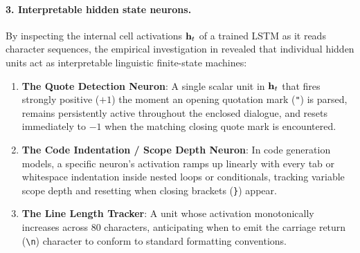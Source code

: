 \documentclass[../../main.tex]{subfiles}
\begin{document}
\paragraph{3. Interpretable hidden state neurons.}
By inspecting the internal cell activations $\mathbf{h}_t$ of a trained LSTM as it reads character sequences, the empirical investigation in \cite{karpathy2015rnn} revealed that individual hidden units act as interpretable linguistic finite-state machines:
\begin{enumerate}
    \item \textbf{The Quote Detection Neuron}: A single scalar unit in $\mathbf{h}_t$ that fires strongly positive ($+1$) the moment an opening quotation mark (\texttt{"}) is parsed, remains persistently active throughout the enclosed dialogue, and resets immediately to $-1$ when the matching closing quote mark is encountered.
    \item \textbf{The Code Indentation / Scope Depth Neuron}: In code generation models, a specific neuron's activation ramps up linearly with every tab or whitespace indentation inside nested loops or conditionals, tracking variable scope depth and resetting when closing brackets (\texttt{\}}) appear.
    \item \textbf{The Line Length Tracker}: A unit whose activation monotonically increases across 80 characters, anticipating when to emit the carriage return (\texttt{\textbackslash n}) character to conform to standard formatting conventions.
\end{enumerate}
\end{document}
